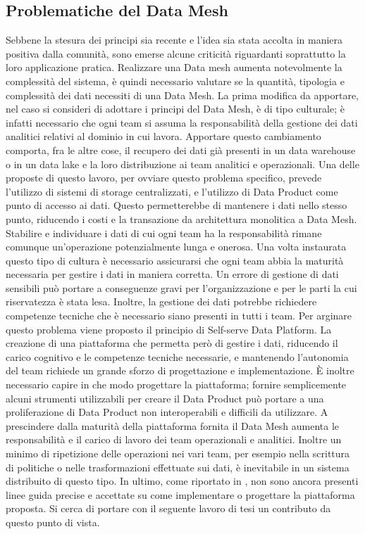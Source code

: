 \documentclass[12pt]{report}
\begin{document}
\subsection{Problematiche del Data Mesh}
Sebbene la stesura dei principi sia recente e l'idea sia stata accolta in maniera positiva dalla comunità, sono emerse alcune criticità riguardanti soprattutto la loro applicazione pratica.
Realizzare una Data mesh aumenta notevolmente la complessità del sistema, è quindi necessario valutare se la quantità, tipologia e complessità dei dati necessiti di una Data Mesh.
La prima modifica da apportare, nel caso si consideri di adottare i principi del Data Mesh, è di tipo culturale; è infatti necessario che ogni team si assuma la responsabilità della gestione dei dati analitici relativi al dominio in cui lavora.
Apportare questo cambiamento comporta, fra le altre cose, il recupero dei dati già presenti in un data warehouse o in un data lake e la loro distribuzione ai team analitici e operazionali.
Una delle proposte di questo lavoro, per ovviare questo problema specifico, prevede l'utilizzo di sistemi di storage centralizzati, e l'utilizzo di Data Product come punto di accesso ai dati.
Questo permetterebbe di mantenere i dati nello stesso punto, riducendo i costi e la transazione da architettura monolitica a Data Mesh.
Stabilire e individuare i dati di cui ogni team ha la responsabilità rimane comunque un'operazione potenzialmente lunga e onerosa.
Una volta instaurata questo tipo di cultura è necessario assicurarsi che ogni team abbia la maturità necessaria per gestire i dati in maniera corretta.
Un errore di gestione di dati sensibili può portare a conseguenze gravi per l'organizzazione e per le parti la cui riservatezza è stata lesa.
Inoltre, la gestione dei dati potrebbe richiedere competenze tecniche che è necessario siano presenti in tutti i team.
Per arginare questo problema viene proposto il principio di Self-serve Data Platform.
La creazione di una piattaforma che permetta però di gestire i dati, riducendo il carico cognitivo e le competenze tecniche necessarie, e mantenendo l'autonomia del team richiede un grande sforzo di progettazione e implementazione.
È inoltre necessario capire in che modo progettare la piattaforma; fornire semplicemente alcuni strumenti utilizzabili per creare il Data Product può portare a una proliferazione di Data Product non interoperabili e difficili da utilizzare.
A prescindere dalla maturità della piattaforma fornita il Data Mesh aumenta le responsabilità e il carico di lavoro dei team operazionali e analitici.
Inoltre un minimo di ripetizione delle operazioni nei vari team, per esempio nella  scrittura di politiche o nelle trasformazioni effettuate sui dati, è inevitabile in un sistema distribuito di questo tipo.
In ultimo, come riportato in \cite{araujo2022advancing}, non sono ancora presenti linee guida precise e accettate su come implementare o progettare la piattaforma proposta.
Si cerca di portare con il seguente lavoro di tesi un contributo da questo punto di vista.
\end{document}

